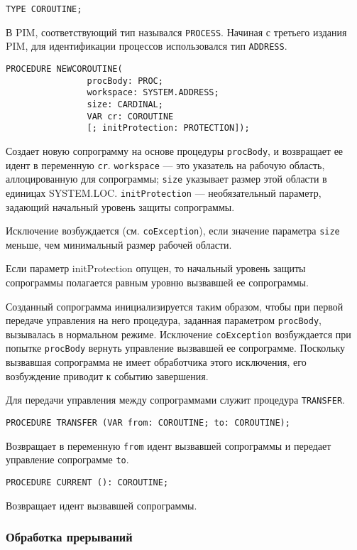 \begin{verbatim}
TYPE COROUTINE;
\end{verbatim}
В PIM, соответствующий тип назывался {\tt PROCESS}.
Начиная с третьего издания PIM, для идентификации
процессов использовался тип {\tt ADDRESS}.

\begin{verbatim}
PROCEDURE NEWCOROUTINE(
                procBody: PROC;
                workspace: SYSTEM.ADDRESS;
                size: CARDINAL;
                VAR cr: COROUTINE
                [; initProtection: PROTECTION]);
\end{verbatim}
Создает новую сопрограмму на основе процедуры {\tt procBody}, 
и возвращает ее идент в переменную {\tt cr}. 
{\tt workspace} --- это указатель на рабочую область, аллоцированную
для сопрограммы;
{\tt size} указывает размер этой области в единицах SYSTEM.LOC. 
{\tt initProtection} --- необязательный параметр, задающий начальный 
уровень защиты сопрограммы.

Исключение возбуждается (см. {\tt coException}), если значение 
параметра {\tt size} меньше, чем минимальный размер рабочей области.

Если параметр initProtection опущен, то начальный уровень защиты сопрограммы
полагается равным уровню вызвавшей ее сопрограммы.

Созданный сопрограмма инициализируется таким образом, чтобы
при первой передаче управления на него процедура, заданная параметром
{\tt procBody}, вызывалась в нормальном режиме. Исключение
{\tt coException} возбуждается при попытке {\tt procBody}
вернуть управление вызвавшей ее сопрограмме.
Поскольку вызвавшая сопрограмма не имеет обработчика этого исключения,
его возбуждение приводит к событию завершения.

Для передачи управления между сопрограммами служит процедура {\tt TRANSFER}.

\begin{verbatim}
PROCEDURE TRANSFER (VAR from: COROUTINE; to: COROUTINE);
\end{verbatim}
Возвращает в переменную {\tt from} идент вызвавшей сопрограммы
и передает управление сопрограмме {\tt to}.

\begin{verbatim}
PROCEDURE CURRENT (): COROUTINE;
\end{verbatim}
Возвращает идент вызвавшей сопрограммы.

\subsubsection{Обработка прерываний}

